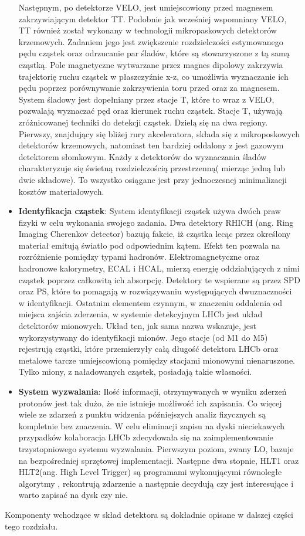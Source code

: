 \begin{itemize}
Następnym, po detektorze VELO, jest umiejscowiony przed magnesem zakrzywiającym detektor TT. Podobnie jak wcześniej wspomniany VELO, TT również został wykonany w technologii mikropaskowych detektorów krzemowych. Zadaniem jego jest zwiększenie rozdzielczości estymowanego pędu cząstek oraz odrzucanie par śladów, które są stowarzyszone z tą samą cząstką. Pole magnetyczne wytwarzane przez magnes dipolowy zakrzywia trajektorię ruchu cząstek w płaszczyźnie x-z, co umożliwia wyznaczanie ich pędu poprzez porównywanie zakrzywienia toru przed oraz za magnesem. System śladowy jest dopełniany przez stacje T, które to wraz z VELO, pozwalają wyznaczać pęd oraz kierunek ruchu cząstek. Stacje T, używają zróżnicowanej techniki do detekcji cząstek. Dzielą się na dwa regiony. Pierwszy, znajdujący się bliżej rury akceleratora, składa się z mikroposkowych detektorów krzemowych, natomiast ten bardziej oddalony z jest  gazowym detektorem słomkowym.
Każdy z detektorów do wyznaczania śladów charakteryzuje się świetną rozdzielczością przestrzenną( mierząc jedną lub dwie składowe). To wszystko osiągane jest przy jednoczesnej minimalizacji kosztów materiałowych. 
\item \textbf{Identyfikacja cząstek}: System identyfikacji cząstek używa dwóch praw  fizyki w celu wykonania swojego zadania. Dwa detektory RHICH  (ang. Ring Imaging Cherenkov detector) bazują fakcie, iż cząstka lecąc przez określony materiał emitują światło pod odpowiednim kątem. Efekt ten pozwala na rozróżnienie pomiędzy typami hadronów. Elektromagnetyczne oraz hadronowe kalorymetry, ECAL i HCAL, mierzą energię oddziałujących z nimi cząstek poprzez całkowitą ich absorpcję. Detektory te wspierane są przez SPD oraz PS, które to pomagają w rozwiązywaniu występujących dwuznaczności w identyfikacji. Ostatnim elementem czynnym, w znaczeniu oddalenia od miejsca  zajścia zderzenia, w systemie detekcyjnym LHCb jest układ detektorów mionowych. Układ ten, jak sama nazwa wskazuje, jest wykorzystywany do identyfikacji mionów. Jego stacje (od M1 do M5) rejestrują cząstki, które przemierzyły całą długość detektora LHCb oraz metalowe tarcze umiejscowioną pomiędzy stacjami mionowymi nienaruszone. Tylko miony, z naładowanych cząstek, posiadają takie własności. 
\item \textbf{System wyzwalania}: Ilość informacji, otrzymywanych w wyniku zderzeń protonów jest tak dużo, że nie istnieje możliwość ich zapisania. Co więcej wiele ze zdarzeń z punktu widzenia późniejszych analiz fizycznych są kompletnie bez znaczenia. W celu eliminacji zapisu na dyski nieciekawych przypadków kolaboracja LHCb zdecydowała się na zaimplementowanie trzystopniowego systemu wyzwalania. Pierwszym poziom, zwany LO, bazuje na bezpośredniej sprzętowej implementacji. Następne dwa stopnie, HLT1 oraz HLT2(ang. High Level Trigger) są programami wykonującymi równoległe algorytmy  , rekontrują zdarzenie a następnie decydują czy jest interesujące i warto zapisać na dysk czy nie.      
\end{itemize} 
Komponenty wchodzące w skład detektora są dokładnie opisane w dalszej części tego rozdziału. 

